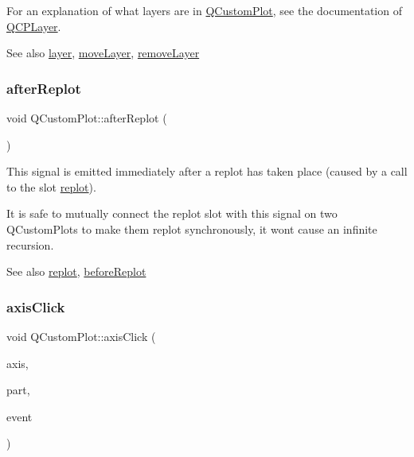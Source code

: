 For an explanation of what layers are in \hyperlink{class_q_custom_plot}{Q\+Custom\+Plot}, see the documentation of \hyperlink{class_q_c_p_layer}{Q\+C\+P\+Layer}.

\begin{DoxySeeAlso}{See also}
\hyperlink{class_q_custom_plot_a0a96244e7773b242ef23c32b7bdfb159}{layer}, \hyperlink{class_q_custom_plot_ae896140beff19424e9e9e02d6e331104}{move\+Layer}, \hyperlink{class_q_custom_plot_a40f75e342c5eaab6a86066a42a0e2a94}{remove\+Layer} 
\end{DoxySeeAlso}
\mbox{\label{class_q_custom_plot_a6f4fa624af060bc5919c5f266cf426a0}} 
\subsubsection{\texorpdfstring{after\+Replot}{afterReplot}}
{\footnotesize\ttfamily void Q\+Custom\+Plot\+::after\+Replot (\begin{DoxyParamCaption}{ }\end{DoxyParamCaption})\hspace{0.3cm}{\ttfamily [signal]}}

This signal is emitted immediately after a replot has taken place (caused by a call to the slot \hyperlink{class_q_custom_plot_aa4bfe7d70dbe67e81d877819b75ab9af}{replot}).

It is safe to mutually connect the replot slot with this signal on two Q\+Custom\+Plots to make them replot synchronously, it won\textquotesingle{}t cause an infinite recursion.

\begin{DoxySeeAlso}{See also}
\hyperlink{class_q_custom_plot_aa4bfe7d70dbe67e81d877819b75ab9af}{replot}, \hyperlink{class_q_custom_plot_a0cd30e29b73efd6afe096e44bc5956f5}{before\+Replot} 
\end{DoxySeeAlso}
\mbox{\label{class_q_custom_plot_abf635f8b56ab5c16d5de9f358543e82b}} 
\subsubsection{\texorpdfstring{axis\+Click}{axisClick}}
{\footnotesize\ttfamily void Q\+Custom\+Plot\+::axis\+Click (\begin{DoxyParamCaption}\item[{\hyperlink{class_q_c_p_axis}{Q\+C\+P\+Axis} $\ast$}]{axis,  }\item[{\hyperlink{class_q_c_p_axis_abee4c7a54c468b1385dfce2c898b115f}{Q\+C\+P\+Axis\+::\+Selectable\+Part}}]{part,  }\item[{Q\+Mouse\+Event $\ast$}]{event }\end{DoxyParamCaption})\hspace{0.3cm}{\ttfamily [signal]}}

